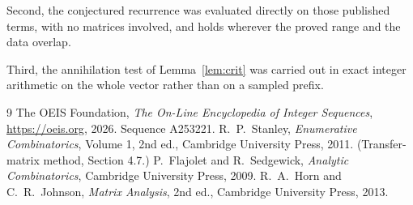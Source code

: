 \documentclass[11pt,a4paper]{article}
\theoremstyle{plain}
\theoremstyle{definition}
\begin{document}
Second, the conjectured recurrence was evaluated directly on those published terms, with no
matrices involved, and holds wherever the proved range and the data overlap.

Third, the annihilation test of Lemma~\ref{lem:crit} was carried out in exact integer
arithmetic on the whole vector rather than on a sampled prefix.

\begin{thebibliography}{9}
 The OEIS Foundation, \emph{The On-Line Encyclopedia of Integer
Sequences}, \url{https://oeis.org}, 2026. Sequence A253221.
 R.~P.~Stanley, \emph{Enumerative Combinatorics}, Volume 1, 2nd ed.,
Cambridge University Press, 2011. (Transfer-matrix method, Section 4.7.)
 P.~Flajolet and R.~Sedgewick, \emph{Analytic Combinatorics}, Cambridge
University Press, 2009.
 R.~A.~Horn and C.~R.~Johnson, \emph{Matrix Analysis}, 2nd ed., Cambridge
University Press, 2013.
\end{thebibliography}
\end{document}
